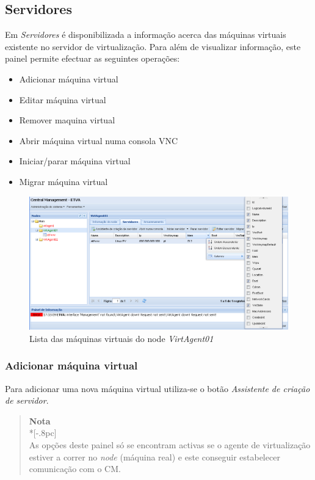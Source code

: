 \subsection{Servidores}
\label{sec:servers}
Em \emph{Servidores} é disponibilizada a informação acerca das máquinas virtuais existente no servidor de virtualização. Para além de visualizar informação, este painel permite efectuar as seguintes operações:
\begin{itemize}
	\item Adicionar máquina virtual
    \item Editar máquina virtual
	\item Remover maquina virtual
	\item Abrir máquina virtual numa consola VNC
	\item Iniciar/parar máquina virtual
    \item Migrar máquina virtual
\end{itemize}
\begin{figure}[H]
	\begin{center}
	\includegraphics[scale=0.45]{screenshots/node_servers.png}
	\caption{Lista das máquinas virtuais do node \emph{VirtAgent01}}
	\label{fig:node_servers}
	\end{center}
\end{figure}

\subsubsection{Adicionar máquina virtual}
\label{sec:add_server}

Para adicionar uma nova máquina virtual utiliza-se o botão \emph{Assistente de criação de servidor}.
\begin{quote}
	{\large \bf Nota} \\*[-.8pc]
	\underline{\hspace{6in}} \\
	As opções deste painel só se encontram activas se o agente de virtualização estiver a correr no \emph{node} (máquina real) e este conseguir estabelecer comunicação com o CM.
\end{quote}
 

